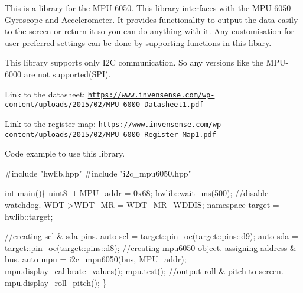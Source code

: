 This is a library for the M\+P\+U-\/6050. This library interfaces with the M\+P\+U-\/6050 Gyroscope and Accelerometer. It provides functionality to output the data easily to the screen or return it so you can do anything with it. Any customisation for user-\/preferred settings can be done by supporting functions in this libary.

This library supports only I2C communication. So any versions like the M\+P\+U-\/6000 are not supported(\+S\+P\+I).



Link to the datasheet\+: \href{https://www.invensense.com/wp-content/uploads/2015/02/MPU-6000-Datasheet1.pdf}{\tt https\+://www.\+invensense.\+com/wp-\/content/uploads/2015/02/\+M\+P\+U-\/6000-\/\+Datasheet1.\+pdf}

Link to the register map\+: \href{https://www.invensense.com/wp-content/uploads/2015/02/MPU-6000-Register-Map1.pdf}{\tt https\+://www.\+invensense.\+com/wp-\/content/uploads/2015/02/\+M\+P\+U-\/6000-\/\+Register-\/\+Map1.\+pdf}

Code example to use this library.


\begin{DoxyCode}
#include "hwlib.hpp"
#include "i2c\_mpu6050.hpp"

int main()\{
      uint8\_t MPU\_addr = 0x68;
      hwlib::wait\_ms(500);
      //disable watchdog.
      WDT->WDT\_MR = WDT\_MR\_WDDIS;
      namespace target = hwlib::target;

      //creating scl & sda pins.
      auto scl = target::pin\_oc(target::pins::d9);
      auto sda = target::pin\_oc(target::pins::d8);
      //creating mpu6050 object. assigning address & bus.
      auto mpu = i2c\_mpu6050(bus, MPU\_addr);
      mpu.display\_calibrate\_values();
      mpu.test();
      //output roll & pitch to screen.
      mpu.display\_roll\_pitch();
\}
\end{DoxyCode}
 